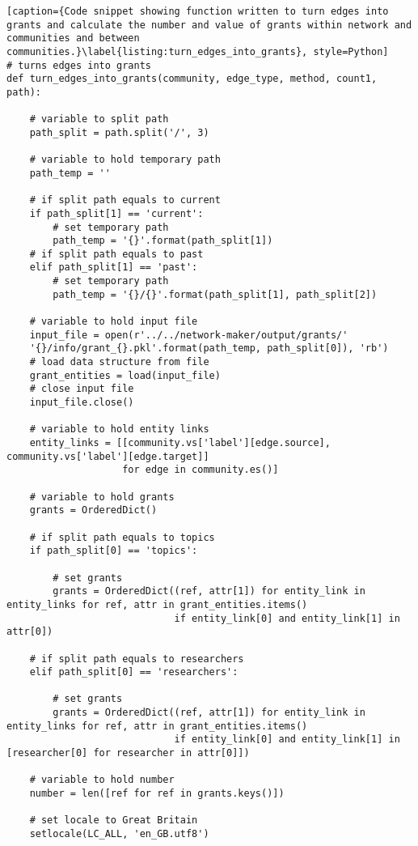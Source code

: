 \begin{lstlisting}[caption={Code snippet showing function written to turn edges into grants and calculate the number and value of grants within network and communities and between communities.}\label{listing:turn_edges_into_grants}, style=Python]
# turns edges into grants
def turn_edges_into_grants(community, edge_type, method, count1, path):

    # variable to split path
    path_split = path.split('/', 3)

    # variable to hold temporary path
    path_temp = ''

    # if split path equals to current
    if path_split[1] == 'current':
        # set temporary path
        path_temp = '{}'.format(path_split[1])
    # if split path equals to past
    elif path_split[1] == 'past':
        # set temporary path
        path_temp = '{}/{}'.format(path_split[1], path_split[2])

    # variable to hold input file
    input_file = open(r'../../network-maker/output/grants/'
    '{}/info/grant_{}.pkl'.format(path_temp, path_split[0]), 'rb')
    # load data structure from file
    grant_entities = load(input_file)
    # close input file
    input_file.close()

    # variable to hold entity links
    entity_links = [[community.vs['label'][edge.source], community.vs['label'][edge.target]]
                    for edge in community.es()]

    # variable to hold grants
    grants = OrderedDict()

    # if split path equals to topics
    if path_split[0] == 'topics':

        # set grants
        grants = OrderedDict((ref, attr[1]) for entity_link in entity_links for ref, attr in grant_entities.items()
                             if entity_link[0] and entity_link[1] in attr[0])

    # if split path equals to researchers
    elif path_split[0] == 'researchers':

        # set grants
        grants = OrderedDict((ref, attr[1]) for entity_link in entity_links for ref, attr in grant_entities.items()
                             if entity_link[0] and entity_link[1] in [researcher[0] for researcher in attr[0]])

    # variable to hold number
    number = len([ref for ref in grants.keys()])

    # set locale to Great Britain
    setlocale(LC_ALL, 'en_GB.utf8')


\end{lstlisting}
